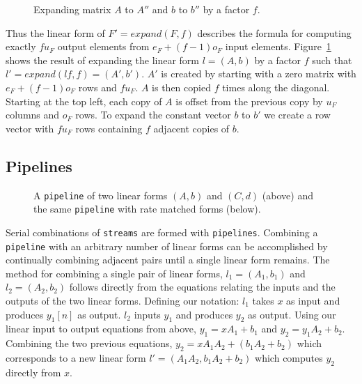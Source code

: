 \begin{figure}
\center
\epsfxsize=3.0in
\caption{Expanding matrix $A$ to $A''$ and $b$ to $b''$ by a factor $f$.}
\label{fig:expanding-a-matrix}
\vspace{-12pt}
\end{figure}

Thus the linear form of $F'=expand(F, f)$ describes the formula for computing
exactly $fu_F$ output elements from $e_F + (f-1)o_F$ input elements.
Figure~\ref{fig:expanding-a-matrix} shows the result of expanding the linear 
form $l = (A,b)$ by a factor $f$ such that $l' = expand(lf, f) = (A',b')$. 
$A'$ is created by starting with a zero matrix with $e_F+(f-1)o_F$ rows 
and $fu_F$. $A$ is then copied $f$ times along the
diagonal. Starting at the top left, each copy of $A$ is offset from the previous copy 
by $u_F$ columns and $o_F$ rows. To expand the constant vector $b$ to $b'$ we 
create a row vector with $fu_F$ rows containing $f$ adjacent copies of $b$.

\subsection{Pipelines}

\begin{figure}
\center
\epsfxsize=3.0in
\caption{A {\tt pipeline} of two linear forms $(A,b)$ and $(C,d)$ (above) and the same {\tt pipeline} with rate matched forms (below).}
\label{fig:combining-pipeline}
\vspace{-12pt}
\end{figure}

Serial combinations of {\tt streams} are formed with {\tt pipelines}.
Combining a {\tt pipeline} with an arbitrary number of linear forms can be accomplished 
by continually combining adjacent pairs until a single linear form remains. 
The method for combining a single pair of linear forms, $l_1=(A_1,b_1)$ and $l_2=(A_2,b_2)$ follows
directly from the equations relating the inputs and the outputs of the 
two linear forms. Defining our notation: $l_1$ takes $x$ as input and produces 
$y_1[n]$ as output. $l_2$ inputs $y_1$ and produces $y_2$ as output. 
Using our linear input to output equations from above, $y_1 = xA_1 + b_1$ 
and $y_2 = y_1A_2 + b_2$. Combining the two previous equations, $y_2 = xA_1A_2 + (b_1A_2 + b_2)$ 
which corresponds to a new linear form $l'=(A_1A_2, b_1A_2+b_2)$ which computes
$y_2$ directly from $x$.

